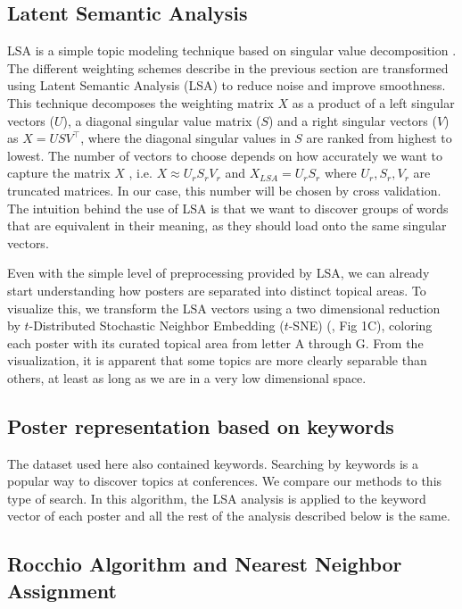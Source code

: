\documentclass[a4paper]{article}
\begin{document}
\subsection{Latent Semantic Analysis}

LSA is a simple topic modeling technique based on singular value decomposition \cite{landauer1998introduction}. The
different weighting schemes describe in the previous section
are transformed using Latent Semantic Analysis (LSA) to reduce noise and improve smoothness. This technique decomposes the weighting matrix $X$ as a product of a left singular vectors ($U$), a diagonal singular value matrix ($S$) and a right singular vectors ($V$) as $X = USV^\top$, where the diagonal singular values in $S$ are ranked from highest to lowest. The number of vectors to choose depends on how accurately we want to capture the matrix $X$ \cite{bishop2006pattern}, i.e. $X \approx U_r S_r V_r$ and $X_{LSA} = U_r S_r$ where $U_r, S_r, V_r$ are truncated matrices. In our case, this number will be chosen by cross validation. The intuition behind the use of LSA is that we want to discover groups of words that are equivalent in their meaning, as they should load onto the same singular vectors.


Even with the simple level of preprocessing provided by LSA, we can already start understanding how posters are separated into distinct topical areas. To visualize this, we transform the LSA vectors using a two dimensional reduction by $t$-Distributed Stochastic Neighbor Embedding ($t$-SNE) (\cite{van2008visualizing}, Fig 1C), coloring each poster with its curated topical area from letter A through G. From the visualization, it is apparent that some topics are more clearly separable than others, at least as long as we are in a very low dimensional space.

\subsection{Poster representation based on keywords}

The dataset used here also contained keywords. Searching by keywords is a popular way to discover topics at conferences. We compare our methods to this type of search. In this algorithm, the LSA analysis is applied to the keyword vector of each poster and all the rest of the analysis described below is the same.


\subsection{Rocchio Algorithm and Nearest Neighbor Assignment}
\end{document}
